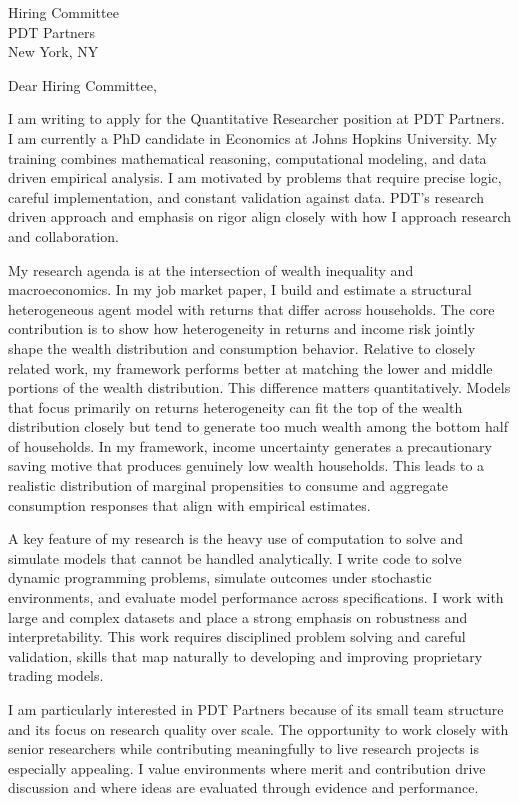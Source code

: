 \documentclass[11pt]{letter}
\begin{document}
\begin{letter}{Hiring Committee \\ PDT Partners \\ New York, NY}

\opening{Dear Hiring Committee,}

I am writing to apply for the Quantitative Researcher position at PDT Partners. I am currently a PhD candidate in Economics at Johns Hopkins University. My training combines mathematical reasoning, computational modeling, and data driven empirical analysis. I am motivated by problems that require precise logic, careful implementation, and constant validation against data. PDT’s research driven approach and emphasis on rigor align closely with how I approach research and collaboration.

My research agenda is at the intersection of wealth inequality and macroeconomics. In my job market paper, I build and estimate a structural heterogeneous agent model with returns that differ across households. The core contribution is to show how heterogeneity in returns and income risk jointly shape the wealth distribution and consumption behavior. Relative to closely related work, my framework performs better at matching the lower and middle portions of the wealth distribution. This difference matters quantitatively. Models that focus primarily on returns heterogeneity can fit the top of the wealth distribution closely but tend to generate too much wealth among the bottom half of households. In my framework, income uncertainty generates a precautionary saving motive that produces genuinely low wealth households. This leads to a realistic distribution of marginal propensities to consume and aggregate consumption responses that align with empirical estimates.

A key feature of my research is the heavy use of computation to solve and simulate models that cannot be handled analytically. I write code to solve dynamic programming problems, simulate outcomes under stochastic environments, and evaluate model performance across specifications. I work with large and complex datasets and place a strong emphasis on robustness and interpretability. This work requires disciplined problem solving and careful validation, skills that map naturally to developing and improving proprietary trading models.

I am particularly interested in PDT Partners because of its small team structure and its focus on research quality over scale. The opportunity to work closely with senior researchers while contributing meaningfully to live research projects is especially appealing. I value environments where merit and contribution drive discussion and where ideas are evaluated through evidence and performance.


\end{letter}
\end{document}
